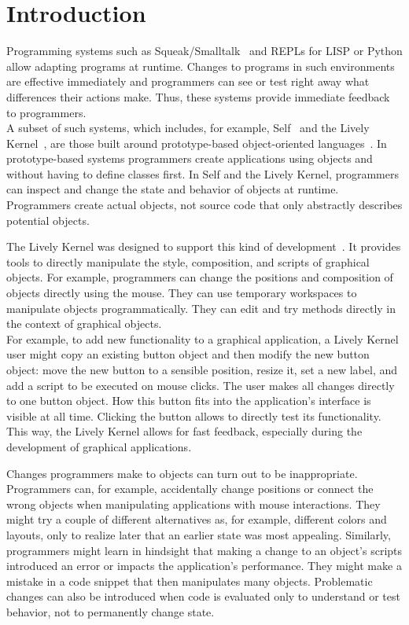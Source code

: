 \chapter{Introduction} \label{chapter:INTRODUCTION}

Programming systems such as Squeak/Smalltalk~\cite{Ingalls1997Squeak,GoldbergRobson83} and REPLs for LISP or Python allow adapting programs at runtime.
Changes to programs in such environments are effective immediately and programmers can see or test right away what differences their actions make.
Thus, these systems provide immediate feedback to programmers.\\
A subset of such systems, which includes, for example, Self~\cite{Ungar1987SPS,Ungar2007SEL} and the Lively Kernel~\cite{Ingalls2008LKS,Krahn2009LWD}, are those built around prototype-based object-oriented languages~\cite{Lieberman1986UPO}.
In prototype-based systems programmers create applications using objects and without having to define classes first.
In Self and the Lively Kernel, programmers can inspect and change the state and behavior of objects at runtime.
Programmers create actual objects, not source code that only abstractly describes potential objects.

The Lively Kernel was designed to support this kind of development~\cite{Lincke2013UTW}.
It provides tools to directly manipulate the style, composition, and scripts of graphical objects.
For example, programmers can change the positions and composition of objects directly using the mouse.
They can use temporary workspaces to manipulate objects programmatically.
They can edit and try methods directly in the context of graphical objects.\\
For example, to add new functionality to a graphical application, a Lively Kernel user might copy an existing button object and then modify the new button object: move the new button to a sensible position, resize it, set a new label, and add a script to be executed on mouse clicks.
The user makes all changes directly to one button object.
How this button fits into the application's interface is visible at all time.
Clicking the button allows to directly test its functionality.
This way, the Lively Kernel allows for fast feedback, especially during the development of graphical applications.

Changes programmers make to objects can turn out to be inappropriate.
Programmers can, for example, accidentally change positions or connect the wrong objects when manipulating applications with mouse interactions.
They might try a couple of different alternatives as, for example, different colors and layouts, only to realize later that an earlier state was most appealing.
Similarly, programmers might learn in hindsight that making a change to an object's scripts introduced an error or impacts the application's performance.
They might make a mistake in a code snippet that then manipulates many objects.
Problematic changes can also be introduced when code is evaluated only to understand or test behavior, not to permanently change state.

